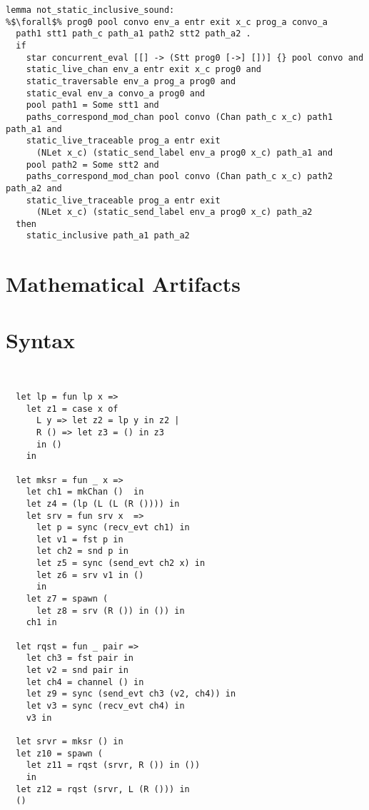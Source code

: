 \documentclass{article}
\begin{document}
\begin{lstlisting}[language=logic, escapechar=\%]
lemma not_static_inclusive_sound:
%$\forall$% prog0 pool convo env_a entr exit x_c prog_a convo_a
  path1 stt1 path_c path_a1 path2 stt2 path_a2 .
  if
    star concurrent_eval [[] -> (Stt prog0 [->] [])] {} pool convo and 
    static_live_chan env_a entr exit x_c prog0 and 
    static_traversable env_a prog_a prog0 and 
    static_eval env_a convo_a prog0 and 
    pool path1 = Some stt1 and 
    paths_correspond_mod_chan pool convo (Chan path_c x_c) path1 path_a1 and 
    static_live_traceable prog_a entr exit
      (NLet x_c) (static_send_label env_a prog0 x_c) path_a1 and 
    pool path2 = Some stt2 and 
    paths_correspond_mod_chan pool convo (Chan path_c x_c) path2 path_a2 and 
    static_live_traceable prog_a entr exit
      (NLet x_c) (static_send_label env_a prog0 x_c) path_a2
  then
    static_inclusive path_a1 path_a2

  \end{lstlisting}












\section{Mathematical Artifacts}


\section{Syntax}

\begin{lstlisting}[language=logic, escapechar=\%]


  let lp = fun lp x => 
    let z1 = case x of 
      L y => let z2 = lp y in z2 |
      R () => let z3 = () in z3
      in ()
    in

  let mksr = fun _ x => 
    let ch1 = mkChan ()  in
    let z4 = (lp (L (L (R ()))) in
    let srv = fun srv x  =>
      let p = sync (recv_evt ch1) in
      let v1 = fst p in
      let ch2 = snd p in 
      let z5 = sync (send_evt ch2 x) in
      let z6 = srv v1 in ()
      in
    let z7 = spawn (
      let z8 = srv (R ()) in ()) in
    ch1 in

  let rqst = fun _ pair =>
    let ch3 = fst pair in
    let v2 = snd pair in
    let ch4 = channel () in
    let z9 = sync (send_evt ch3 (v2, ch4)) in
    let v3 = sync (recv_evt ch4) in
    v3 in

  let srvr = mksr () in
  let z10 = spawn ( 
    let z11 = rqst (srvr, R ()) in ())
    in
  let z12 = rqst (srvr, L (R ())) in
  () 

  \end{lstlisting}
\end{document}
